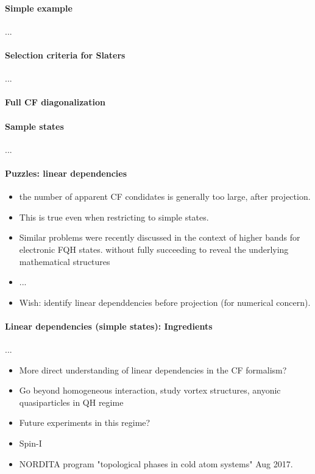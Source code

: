 \documentclass{article}
\numberwithin{equation}{subsection} %
\theoremstyle{definition}
\begin{document}
\paragraph{Simple example}...

\paragraph{Selection criteria for Slaters}...
\paragraph{Full CF diagonalization}
\paragraph{Sample states}...
\paragraph{Puzzles: linear dependencies}

\begin{itemize}
    \item the number of apparent CF condidates is generally too large,
        after projection.
    \item This is true even when restricting to simple states.
    \item Similar problems were recently discussed in the context of
        higher bands for electronic FQH states. without fully succeeding
        to reveal the underlying mathematical structures
    \item ...
    \item Wish: identify linear dependdencies before projection (for
        numerical concern).
\end{itemize}
\paragraph{Linear dependencies (simple states): Ingredients} ...
\begin{itemize}
    \item More direct understanding of linear dependencies in the CF
        formalism?
    \item Go beyond homogeneous interaction, study vortex structures,
        anyonic quasiparticles in QH regime
    \item Future experiments in this regime?
    \item Spin-I
    \item NORDITA program "topological phases in cold atom systems" Aug
        2017.
\end{itemize}
\end{document}
